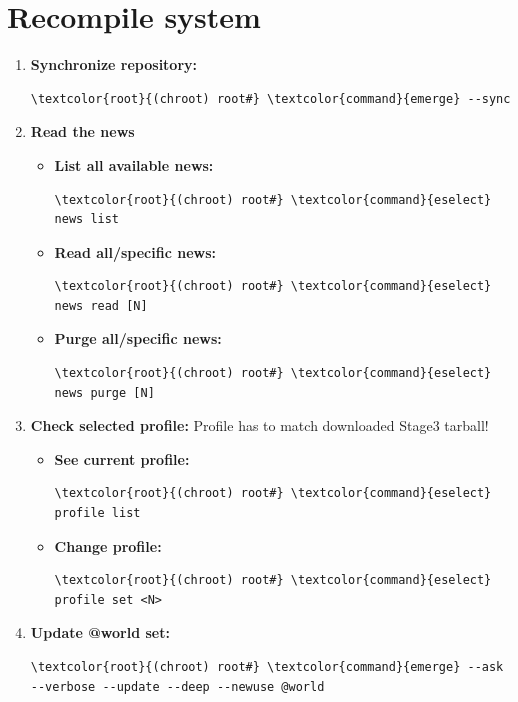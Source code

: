 \documentclass[10pt, a4paper, onecolumn, oneside, titlepage, openany]{book}
\begin{document}
\section{Recompile system}
\begin{enumerate}
    \item \textbf{Synchronize repository:}
\begin{Verbatim}[commandchars=\\\{\}]
\textcolor{root}{(chroot) root#} \textcolor{command}{emerge} --sync
\end{Verbatim}
    \item \textbf{Read the news}
    \begin{itemize}
        \item \textbf{List all available news:}
\begin{Verbatim}[commandchars=\\\{\}]
\textcolor{root}{(chroot) root#} \textcolor{command}{eselect} news list
\end{Verbatim}
        \item \textbf{Read all/specific news:}
\begin{Verbatim}[commandchars=\\\{\}]
\textcolor{root}{(chroot) root#} \textcolor{command}{eselect} news read [N]
\end{Verbatim}
        \item \textbf{Purge all/specific news:}
\begin{Verbatim}[commandchars=\\\{\}]
\textcolor{root}{(chroot) root#} \textcolor{command}{eselect} news purge [N]
\end{Verbatim}
    \end{itemize}
    \item \textbf{Check selected profile:}
\newline Profile has to match downloaded Stage3 tarball!
    \begin{itemize}
        \item \textbf{See current profile:}
\begin{Verbatim}[commandchars=\\\{\}]
\textcolor{root}{(chroot) root#} \textcolor{command}{eselect} profile list
\end{Verbatim}
        \item \textbf{Change profile:}
\begin{Verbatim}[commandchars=\\\{\}]
\textcolor{root}{(chroot) root#} \textcolor{command}{eselect} profile set <N>
\end{Verbatim}
    \end{itemize}
    \item \textbf{Update @world set:}
\begin{Verbatim}[commandchars=\\\{\}]
\textcolor{root}{(chroot) root#} \textcolor{command}{emerge} --ask --verbose --update --deep --newuse @world
\end{Verbatim}
\end{enumerate}
\end{document}
